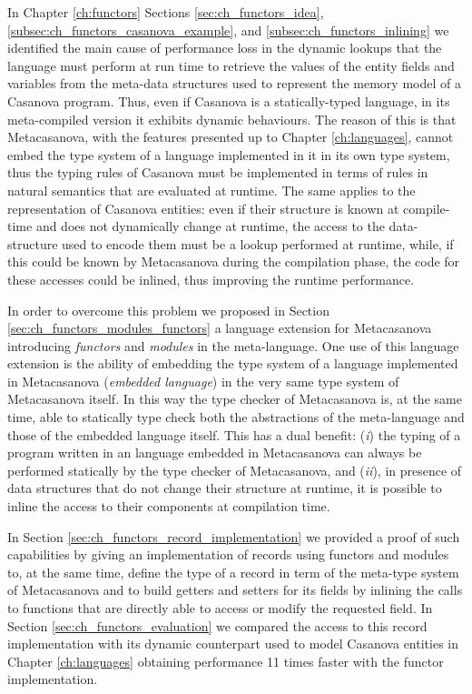 In Chapter \ref{ch:functors} Sections \ref{sec:ch_functors_idea}, \ref{subsec:ch_functors_casanova_example}, and \ref{subsec:ch_functors_inlining} we identified the main cause of performance loss in the dynamic lookups that the language must perform at run time to retrieve the values of the entity fields and variables from the meta-data structures used to represent the memory model of a Casanova program. Thus, even if Casanova is a statically-typed language, in its meta-compiled version it exhibits dynamic behaviours. The reason of this is that Metacasanova, with the features presented up to Chapter \ref{ch:languages}, cannot embed the type system of a language implemented in it in its own type system, thus the typing rules of Casanova must be implemented in terms of rules in natural semantics that are evaluated at runtime. The same applies to the representation of Casanova entities: even if their structure is known at compile-time and does not dynamically change at runtime, the access to the data-structure used to encode them must be a lookup performed at runtime, while, if this could be known by Metacasanova during the compilation phase, the code for these accesses could be inlined, thus improving the runtime performance.

In order to overcome this problem we proposed in Section \ref{sec:ch_functors_modules_functors} a language extension for Metacasanova introducing \textit{functors} and \textit{modules} in the meta-language. One use of this language extension is the ability of embedding the type system of a language implemented in Metacasanova (\textit{embedded language}) in the very same type system of Metacasanova itself. In this way the type checker of Metacasanova is, at the same time, able to statically type check both the abstractions of the meta-language and those of the embedded language itself. This has a dual benefit: (\textit{i}) the typing of a program written in an language embedded in Metacasanova can always be performed statically by the type checker of Metacasanova, and (\textit{ii}), in presence of data structures that do not change their structure at runtime, it is possible to inline the access to their components at compilation time.

In Section \ref{sec:ch_functors_record_implementation} we provided a proof of such capabilities by giving an implementation of records using functors and modules to, at the same time, define the type of a record in term of the meta-type system of Metacasanova and to build getters and setters for its fields by inlining the calls to functions that are directly able to access or modify the requested field. In Section \ref{sec:ch_functors_evaluation} we compared the access to this record implementation with its dynamic counterpart used to model Casanova entities in Chapter \ref{ch:languages} obtaining performance 11 times faster with the functor implementation.

